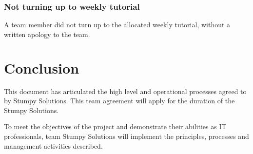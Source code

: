 \documentclass[12pt, a4paper, onecolumn]{article}
\begin{document}
\subsubsection{Not turning up to weekly tutorial}
A team member did not turn up to the allocated weekly tutorial, without
a written apology to the team.

\newpage
\section{Conclusion}
This document has articulated the high level and operational
processes agreed to by Stumpy Solutions.  This team agreement
will apply for the duration of the Stumpy Solutions.

To meet the objectives of the project and demonstrate their
abilities as IT professionals, team Stumpy Solutions will implement
the principles, processes and management activities described.

\newpage
\begin{thebibliography}{9}
\end{thebibliography}

\newpage
\begin{appendices}
\end{appendices}
\end{document}
